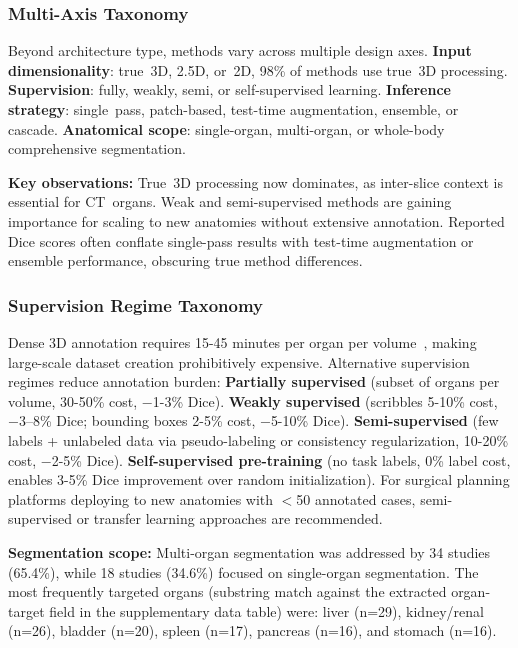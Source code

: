 \documentclass[conference]{IEEEtran}
\begin{document}
\subsubsection{Multi-Axis Taxonomy}

Beyond architecture type, methods vary across multiple design axes. \textbf{Input dimensionality}: true~3D, 2.5D, or~2D, 98\% of methods use true~3D processing. \textbf{Supervision}: fully, weakly, semi, or self-supervised learning. \textbf{Inference strategy}: single~pass, patch-based, test-time augmentation, ensemble, or cascade. \textbf{Anatomical scope}: single-organ, multi-organ, or whole-body comprehensive segmentation.

\textbf{Key observations:} True~3D processing now dominates, as inter-slice context is essential for CT~organs. Weak and semi-supervised methods are gaining importance for scaling to new anatomies without extensive annotation. Reported Dice scores often conflate single-pass results with test-time augmentation or ensemble performance, obscuring true method differences.

\subsubsection{Supervision Regime Taxonomy}
\label{sec:supervision_taxonomy}

Dense 3D annotation requires 15-45 minutes per organ per volume~\cite{sharma2010automated}, making large-scale dataset creation prohibitively expensive. Alternative supervision regimes reduce annotation burden: \textbf{Partially supervised} (subset of organs per volume, 30-50\% cost, $-$1-3\% Dice). \textbf{Weakly supervised} (scribbles 5-10\% cost, $-$3--8\% Dice; bounding boxes 2-5\% cost, $-$5-10\% Dice). \textbf{Semi-supervised} (few labels + unlabeled data via pseudo-labeling or consistency regularization, 10-20\% cost, $-$2-5\% Dice). \textbf{Self-supervised pre-training} (no task labels, 0\% label cost, enables 3-5\% Dice improvement over random initialization). For surgical planning platforms deploying to new anatomies with $<$50 annotated cases, semi-supervised or transfer learning approaches are recommended.

\textbf{Segmentation scope:} Multi-organ segmentation was addressed by 34 studies (65.4\%), while 18 studies (34.6\%) focused on single-organ segmentation. The most frequently targeted organs (substring match against the extracted organ-target field in the supplementary data table) were: liver (n=29), kidney/renal (n=26), bladder (n=20), spleen (n=17), pancreas (n=16), and stomach (n=16).
\end{document}
